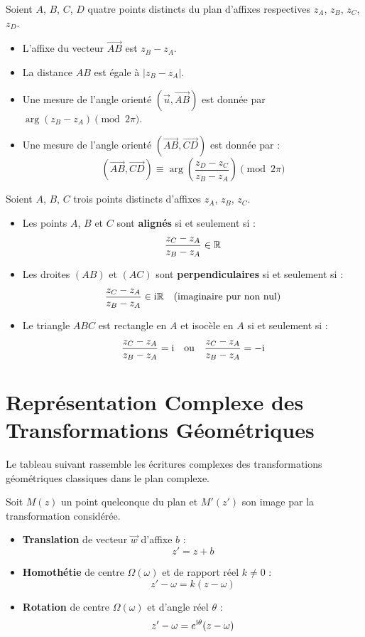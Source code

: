\begin{propriete}
Soient $A$, $B$, $C$, $D$ quatre points distincts du plan d'affixes respectives $z_A$, $z_B$, $z_C$, $z_D$.
\begin{itemize}
    \item L'affixe du vecteur $\vec{AB}$ est $z_B - z_A$.
    \item La distance $AB$ est égale à $|z_B - z_A|$.
    \item Une mesure de l'angle orienté $(\vec{u}, \vec{AB})$ est donnée par $\arg(z_B - z_A) \pmod{2\pi}$.
    \item Une mesure de l'angle orienté $(\vec{AB}, \vec{CD})$ est donnée par :
    \[
    (\vec{AB}, \vec{CD}) \equiv \arg\left( \frac{z_D - z_C}{z_B - z_A} \right) \pmod{2\pi}
    \]
\end{itemize}
\end{propriete}

\begin{propriete}
Soient $A$, $B$, $C$ trois points distincts d'affixes $z_A$, $z_B$, $z_C$.
\begin{itemize}
    \item Les points $A$, $B$ et $C$ sont \textbf{alignés} si et seulement si :
    \[
    \frac{z_C - z_A}{z_B - z_A} \in \mathbb{R}
    \]
    \item Les droites $(AB)$ et $(AC)$ sont \textbf{perpendiculaires} si et seulement si :
    \[
    \frac{z_C - z_A}{z_B - z_A} \in \mathrm{i}\mathbb{R} \quad (\text{imaginaire pur non nul})
    \]
    \item Le triangle $ABC$ est rectangle en $A$ et isocèle en $A$ si et seulement si :
    \[
    \frac{z_C - z_A}{z_B - z_A} = \mathrm{i} \quad \text{ou} \quad \frac{z_C - z_A}{z_B - z_A} = -\mathrm{i}
    \]
\end{itemize}
\end{propriete}

\section{Représentation Complexe des Transformations Géométriques}

Le tableau suivant rassemble les écritures complexes des transformations géométriques classiques dans le plan complexe.

\begin{theoreme}
Soit $M(z)$ un point quelconque du plan et $M'(z')$ son image par la transformation considérée.
\begin{itemize}
    \item \textbf{Translation} de vecteur $\vec{w}$ d'affixe $b$ :
    \[
    z' = z + b
    \]
    \item \textbf{Homothétie} de centre $\Omega(\omega)$ et de rapport réel $k \ne 0$ :
    \[
    z' - \omega = k(z - \omega)
    \]
    \item \textbf{Rotation} de centre $\Omega(\omega)$ et d'angle réel $\theta$ :
    \[
    z' - \omega = e^{\mathrm{i}\theta}(z - \omega)
    \]
\end{itemize}
\end{theoreme}

